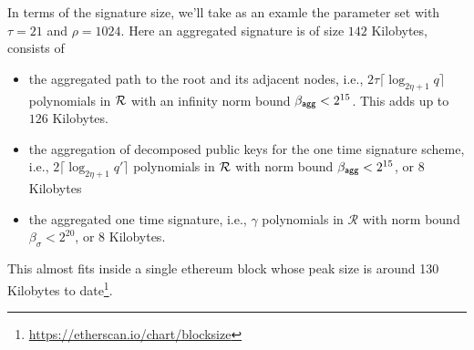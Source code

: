 In terms of the signature size, we'll take as an examle the parameter set with $\tau=21$ and $\rho=1024$.
Here an aggregated signature is of size $142$ Kilobytes, consists of 
\begin{itemize}
  \item the aggregated path to the root and its adjacent nodes, i.e., $2\tau\lceil\log_{2\eta+1}q\rceil$ polynomials in $\mathcal{R}$ with an infinity norm bound $\beta_{\mathsf{agg}} <2^{15}$.
  This adds up to $126$ Kilobytes.
  \item the aggregation of decomposed public keys for the one time signature scheme, i.e., $2\lceil\log_{2\eta+1}q'\rceil$ polynomials in $\mathcal{R}$ with norm bound $\beta_{\mathsf{agg}} < 2^{15}$, or $8$ Kilobytes 
  \item the aggregated one time signature, i.e., $\gamma$ polynomials in $\mathcal{R}$ with norm bound $\beta_\sigma < 2^{20}$, or $8$ Kilobytes.
\end{itemize}
This almost fits inside a single ethereum block whose peak size is around 130 Kilobytes to date\footnote{\url{https://etherscan.io/chart/blocksize}}.

